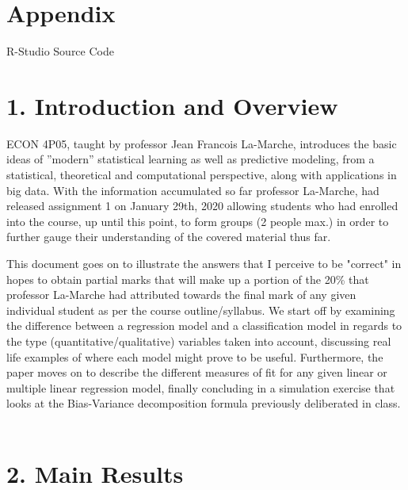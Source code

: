 \documentclass{article}
\begin{document}
\section{Appendix}
\hspace{1.27cm} R-Studio Source Code

\newpage
\listoftables

\listoffigures


\newpage

\section*{1. \space Introduction and Overview}
\hspace{1.27cm}\par
ECON 4P05, taught by professor Jean Francois La-Marche, introduces the basic ideas of ”modern” statistical learning as well as predictive modeling, from a statistical, theoretical and computational perspective, along with applications in big data. With the information accumulated so far professor La-Marche, had released assignment 1 on January 29th, 2020 allowing students who had enrolled into the course, up until this point, to form groups (2 people max.) in order to further gauge their understanding of the covered material thus far. \par

This document goes on to illustrate the answers that I perceive to be "correct" in hopes to obtain partial marks that will make up a portion of the 20\% that professor La-Marche had attributed towards the final mark of any given individual student as per the course outline/syllabus. We start off by examining the difference between a regression model and a classification model in regards to the type (quantitative/qualitative) variables taken into account, discussing real life examples of where each model might prove to be useful. Furthermore, the paper moves on to describe the different measures of fit for any given linear or multiple linear regression model, finally concluding in a simulation exercise that looks at the Bias-Variance decomposition formula previously deliberated in class.\\
\hspace{1.27cm}\\
\section*{2. \space Main Results}
\end{document}
